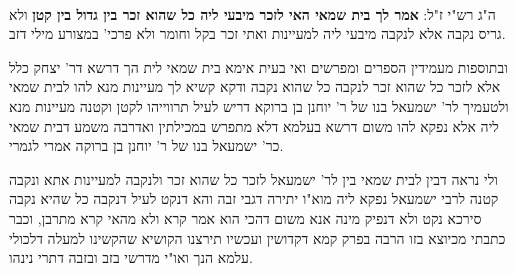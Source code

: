 \documentclass[12pt, openany]{book}
\newcommand{\sethebfont}{
\fontsize{10.5pt}{21.0pt} \selectfont
}
\newcommand{\twocol}[1]{
	{\sethebfont \begin{multicols}{2}
			#1
	\end{multicols}}	
}
\newcommand{\textblock}[1]{
{\sethebfont #1\\}	
}
\begin{document}
\textblock{}{}
\twocol{ה"ג רש"י ז"ל: \textbf{אמר לך בית שמאי האי לזכר מיבעי ליה כל שהוא זכר בין גדול בין קטן}  ולא גריס נקבה אלא לנקבה מיבעי ליה למעיינות ואתי זכר בקל וחומר ולא פרכי' במצורע מילי דזב.\par  ובתוספות מעמידין הספרים ומפרשים ואי בעית אימא בית שמאי לית הך דרשא דר' יצחק כלל אלא לזכר כל שהוא זכר לנקבה כל שהוא נקבה ודקא קשיא לך מעיינות מנא להו לבית שמאי ולטעמיך לר' ישמעאל בנו של ר' יוחנן בן ברוקא דריש לעיל תרווייהו לקטן וקטנה מעיינות מנא ליה אלא נפקא להו משום דרשא בעלמא דלא מתפרש במכילתין ואדרבה משמע דבית שמאי כר' ישמעאל בנו של ר' יוחנן בן ברוקה אמרי לגמרי.\par  ולי נראה דבין לבית שמאי בין לר' ישמעאל לזכר כל שהוא זכר ולנקבה למעיינות אתא ונקבה קטנה לרבי ישמעאל נפקא ליה מוא"ו יתירה דגבי זבה והא דנקט לעיל דנקבה כל שהיא נקבה סירכא נקט ולא דנפיק מינה אנא משום דהכי הוא אמר קרא ולא מהאי קרא מתרבן, וכבר כתבתי מכיוצא בזו הרבה בפרק קמא דקדושין ועכשיו תירצנו הקושיא שהקשינו למעלה דלכולי עלמא הנך ואו"י מדרשי בזב ובזבה דתרי נינהו. 
}
\end{document}
